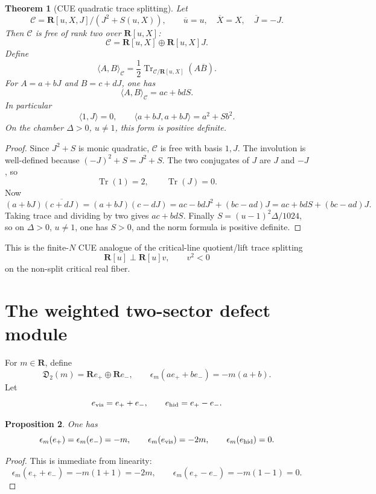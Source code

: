 \documentclass[11pt]{article}
\newcommand{\R}{\mathbf R}
\newcommand{\Tr}{\operatorname{Tr}}
\theoremstyle{plain}
\newtheorem{theorem}{Theorem}[section]
\newtheorem{proposition}[theorem]{Proposition}
\theoremstyle{definition}
\numberwithin{equation}{section}
\begin{document}
\begin{theorem}[CUE quadratic trace splitting]\label{thm:n3trace}
Let
\[
 \mathcal C=\R[u,X,J]/(J^2+S(u,X)),
 \qquad
 \overline u=u,
 \quad
 \overline X=X,
 \quad
 \overline J=-J.
\]
Then \(\mathcal C\) is free of rank two over \(\R[u,X]\):
\[
 \mathcal C=\R[u,X]\oplus\R[u,X]J.
\]
Define
\[
 \langle A,B\rangle_{\mathcal C}=\frac12\Tr_{\mathcal C/\R[u,X]}(A\overline B).
\]
For \(A=a+bJ\) and \(B=c+dJ\), one has
\[
 \langle A,B\rangle_{\mathcal C}=ac+bdS.
\]
In particular
\[
 \langle1,J\rangle=0,
 \qquad
 \langle a+bJ,a+bJ\rangle=a^2+Sb^2.
\]
On the chamber \(\Delta>0\), \(u\ne1\), this form is positive definite.
\end{theorem}

\begin{proof}
Since \(J^2+S\) is monic quadratic, \(\mathcal C\) is free with basis \(1,J\).  The involution is well-defined because \((-J)^2+S=J^2+S\).  The two conjugates of \(J\) are \(J\) and \(-J\), so
\[
 \Tr(1)=2,
 \qquad
 \Tr(J)=0.
\]
Now
\[
 (a+bJ)\overline{(c+dJ)}=(a+bJ)(c-dJ)=ac-bdJ^2+(bc-ad)J=ac+bdS+(bc-ad)J.
\]
Taking trace and dividing by two gives \(ac+bdS\).  Finally \(S=(u-1)^2\Delta/1024\), so on \(\Delta>0\), \(u\ne1\), one has \(S>0\), and the norm formula is positive definite.
\end{proof}

This is the finite-\(N\) CUE analogue of the critical-line quotient/lift trace splitting
\[
 \R[u]\perp\R[u]v,
 \qquad
 v^2<0
\]
on the non-split critical real fiber.

\section{The weighted two-sector defect module}

For \(m\in\R\), define
\[
 \mathfrak D_2(m)=\R e_+\oplus\R e_-,
 \qquad
 \epsilon_m(ae_++be_-)=-m(a+b).
\]
Let
\[
 e_{\rm vis}=e_++e_-,
 \qquad
 e_{\rm hid}=e_+-e_-.
\]

\begin{proposition}
One has
\[
 \epsilon_m(e_+)=\epsilon_m(e_-)=-m,
 \qquad
 \epsilon_m(e_{\rm vis})=-2m,
 \qquad
 \epsilon_m(e_{\rm hid})=0.
\]
\end{proposition}

\begin{proof}
This is immediate from linearity:
\[
 \epsilon_m(e_++e_-)=-m(1+1)=-2m,
 \qquad
 \epsilon_m(e_+-e_-)=-m(1-1)=0.
\]
\end{proof}
\end{document}
